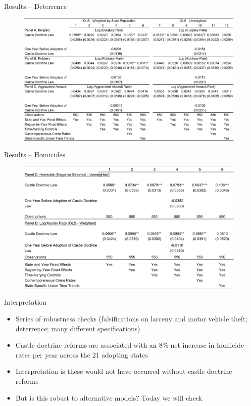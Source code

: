 \documentclass{beamer}
\begin{document}
\begin{frame}{Results -- Deterrence}
	
	\begin{figure}
	\includegraphics[scale=0.4]{./lecture_includes/cheng4.pdf}
	\end{figure}
\end{frame}




\begin{frame}{Results -- Homicides}
	
	\begin{figure}
	\includegraphics[scale=0.4]{./lecture_includes/cheng12.pdf}
	\end{figure}
\end{frame}



\begin{frame}{Interpretation}
	
	\begin{itemize}
	\item Series of robustness checks (falsifications on larceny and motor vehicle theft; deterrence; many different specifications)
	\item Castle doctrine reforms are associated with an 8\% net increase in homicide rates per year across the 21 adopting states
	\item Interpretation is these would not have occurred without castle doctrine reforms
	\item But is this robust to alternative models? Today we will check
	\end{itemize}
\end{frame}
\end{document}
